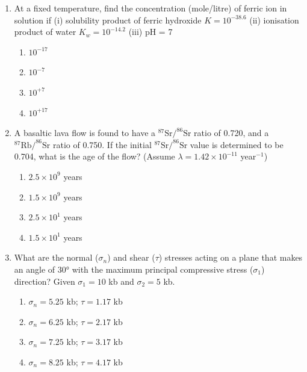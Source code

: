 \documentclass[journal,12pt,onecolumn]{IEEEtran}
\theoremstyle{remark}
\begin{document}
\begin{enumerate}[resume]
\item At a fixed temperature, find the concentration (mole/litre) of ferric ion in solution if  
(i) solubility product of ferric hydroxide $K = 10^{-38.6}$  
(ii) ionisation product of water $K_w = 10^{-14.2}$  
(iii) pH = 7

\begin{multicols}{4}
\begin{enumerate}
\item $10^{-17}$  
\item $10^{-7}$  
\item $10^{+7}$  
\item $10^{+17}$  
\end{enumerate}
\end{multicols}
\vspace{0.5cm}

\item A basaltic lava flow is found to have a $^{87}\text{Sr}/^{86}\text{Sr}$ ratio of 0.720, and a $^{87}\text{Rb}/^{86}\text{Sr}$ ratio of 0.750. If the initial $^{87}\text{Sr}/^{86}\text{Sr}$ value is determined to be 0.704, what is the age of the flow? (Assume $\lambda = 1.42 \times 10^{-11}$ year$^{-1}$)

\begin{multicols}{4}
\begin{enumerate}
\item $2.5 \times 10^9$ years  
\item $1.5 \times 10^9$ years  
\item $2.5 \times 10^1$ years  
\item $1.5 \times 10^1$ years  
\end{enumerate}
\end{multicols}
\vspace{0.5cm}

\item What are the normal ($\sigma_n$) and shear ($\tau$) stresses acting on a plane that makes an angle of 30° with the maximum principal compressive stress ($\sigma_1$) direction? Given $\sigma_1 = 10$ kb and $\sigma_2 = 5$ kb.

\begin{multicols}{2}
\begin{enumerate}
\item $\sigma_n = 5.25$ kb; $\tau = 1.17$ kb  
\item $\sigma_n = 6.25$ kb; $\tau = 2.17$ kb  
\item $\sigma_n = 7.25$ kb; $\tau = 3.17$ kb  
\item $\sigma_n = 8.25$ kb; $\tau = 4.17$ kb  
\end{enumerate}
\end{multicols}
\vspace{0.5cm}


\end{enumerate}
\end{document}
